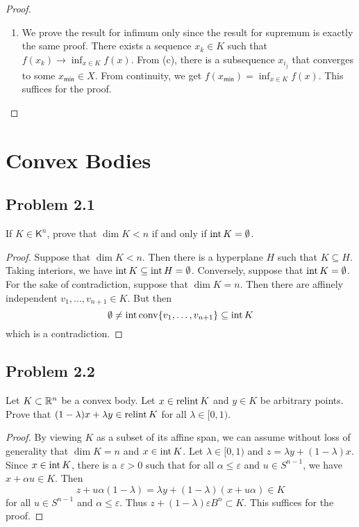 \documentclass[12pt]{article}
\begin{document}
\begin{proof}
\begin{enumerate}[label = (\alph*)]
		\item We prove the result for infimum only since the result for supremum is exactly the same proof. There exists a sequence $x_k \in K$ such that $f(x_k) \to \inf_{x \in K} f(x)$. From (c), there is a subsequence $x_{i_j}$ that converges to some $x_{\mathsf{min}} \in X$. From continuity, we get $f(x_{\mathsf{min}}) = \inf_{x \in K} f(x)$. This suffices for the proof. 
	\end{enumerate}
\end{proof}

\newpage 

\section{Convex Bodies}

\subsection{Problem 2.1}

\begin{problem}
	If $K \in \mathsf{K}^n$, prove that $\dim K < n$ if and only if $\operatorname{int} K = \emptyset$. 
\end{problem}

\begin{proof}
	Suppose that $\dim K < n$. Then there is a hyperplane $H$ such that $K \subseteq H$. Taking interiors, we have $\operatorname{int} K \subseteq \operatorname{int} H = \emptyset$. Conversely, suppose that $\operatorname{int} K = \emptyset$. For the sake of contradiction, suppose that $\dim K = n$. Then there are affinely independent $v_1, \ldots, v_{n+1} \in K$. But then 
	\[
		\emptyset \neq \operatorname{int} \operatorname{conv} \{v_1, \ldots, v_{n+1}\} \subseteq \operatorname{int} K
	\]
	which is a contradiction. 
\end{proof}
\newpage 

\subsection{Problem 2.2}

\begin{problem} \label{problem-2.2}
	Let $K \subset \mathbb{R}^n$ be a convex body. Let $x \in \operatorname{relint} K$ and $y \in K$ be arbitrary points. Prove that $(1- \lambda) x + \lambda y \in \operatorname{relint} K$ for all $\lambda \in [0, 1)$.
\end{problem}

\begin{proof}
	By viewing $K$ as a subset of its affine span, we can assume without loss of generality that $\dim K = n$ and $x \in \operatorname{int} K$. Let $\lambda \in [0, 1)$ and $z = \lambda y + (1-\lambda) x$. Since $x \in \operatorname{int} K$, there is a $\varepsilon > 0$ such that for all $\alpha \leq \varepsilon$ and $u \in S^{n-1}$, we have $x + \alpha u \in K$. Then 
	\[
		z + u \alpha (1 - \lambda) = \lambda y + (1 - \lambda) (x + u \alpha) \in K
	\]
	for all $u \in S^{n-1}$ and $\alpha \leq \varepsilon$. Thus $z + (1-\lambda)\varepsilon B^n \subset K$. This suffices for the proof. 
\end{proof}
\end{document}
